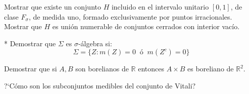 \documentclass{book}
\newcommand{\rr}{\mathbb{R}}
\begin{document}
   \begin{ejer}{} 
	Mostrar que existe un conjunto $H$ incluido en el intervalo unitario $[0,1]$, de clase
  $F_{\sigma}$, de medida uno, formado exclusivamente por puntos irracionales. 
  \\
  Mostrar que $H$ es unión numerable de conjuntos cerrados con interior vacío.
\end{ejer} 

   \begin{ejer}{}  * 	Demostrar que $\Sigma$ es $\sigma$-álgebra si:
	\[\Sigma=\{Z:m(Z)=0 \;\;\text{ó}\;\; m(Z^c)=0\}
	\]
	\end{ejer} 

	\begin{ejer}{} Demostrar que si $A,B$ son borelianos de $\rr$ entonces $A\times B$ es boreliano de $\rr^2$. 
	 
	\end{ejer}


  
   \begin{ejer}{} 
	?`Cómo son los subconjuntos medibles del conjunto de Vitali?
\end{ejer} 
\end{document}
